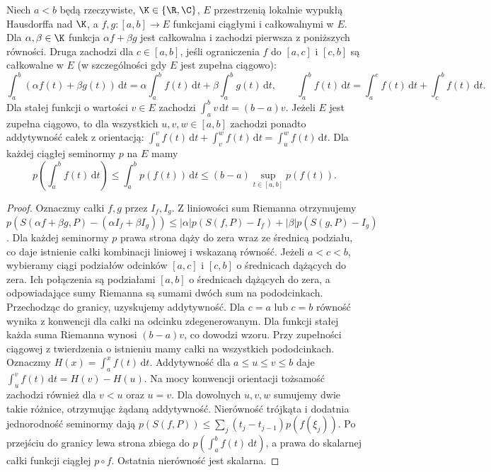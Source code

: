 \begin{stwierdzenie}
\label{prop:riemann-seminorm15a}
Niech $a<b$ będą rzeczywiste, $\K\in\{\R,\C\}$,
$E$ przestrzenią lokalnie wypukłą Hausdorffa nad $\K$,
a $f,g:[a,b]\to E$ funkcjami ciągłymi i całkowalnymi w $E$.
Dla $\alpha,\beta\in\K$ funkcja $\alpha f+\beta g$ jest
całkowalna i zachodzi pierwsza z poniższych równości.
Druga zachodzi dla $c\in[a,b]$, jeśli ograniczenia $f$ do $[a,c]$
i $[c,b]$ są całkowalne w $E$ (w szczególności gdy $E$ jest zupełna ciągowo):
\[
 \int_a^b(\alpha f(t)+\beta g(t))\,\mathrm dt
 =\alpha\int_a^b f(t)\,\mathrm dt+\beta\int_a^b g(t)\,\mathrm dt,
 \qquad \int_a^b f(t)\,\mathrm dt=\int_a^c f(t)\,\mathrm dt
 +\int_c^b f(t)\,\mathrm dt.
\]
Dla stałej funkcji o wartości $v\in E$ zachodzi
$\int_a^b v\,\mathrm dt=(b-a)v$.
Jeżeli $E$ jest zupełna ciągowo, to dla wszystkich
$u,v,w\in[a,b]$ zachodzi ponadto addytywność całek z orientacją:
$\int_u^v f(t)\,\mathrm dt+\int_v^w f(t)\,\mathrm dt
=\int_u^w f(t)\,\mathrm dt$.
Dla każdej ciągłej seminormy $p$ na $E$ mamy
\[
 p\left(\int_a^b f(t)\,\mathrm dt\right)
 \le\int_a^b p(f(t))\,\mathrm dt
 \le (b-a)\sup_{t\in[a,b]}p(f(t)).
\]
\end{stwierdzenie}
\begin{proof}
Oznaczmy całki $f,g$ przez $I_f,I_g$. Z liniowości sum
Riemanna otrzymujemy
$p(S(\alpha f+\beta g,P)-(\alpha I_f+\beta I_g))
\le|\alpha|p(S(f,P)-I_f)+|\beta|p(S(g,P)-I_g)$.
Dla każdej seminormy $p$ prawa strona dąży do zera
wraz ze średnicą podziału, co daje istnienie całki
kombinacji liniowej i wskazaną równość.
Jeżeli $a<c<b$, wybieramy ciągi podziałów odcinków $[a,c]$
i $[c,b]$ o średnicach dążących do zera. Ich połączenia są
podziałami $[a,b]$ o średnicach dążących do zera, a odpowiadające
sumy Riemanna są sumami dwóch sum na pododcinkach.
Przechodząc do granicy, uzyskujemy addytywność.
Dla $c=a$ lub $c=b$ równość wynika z konwencji dla całki
na odcinku zdegenerowanym. Dla funkcji stałej każda suma
Riemanna wynosi $(b-a)v$, co dowodzi wzoru.
Przy zupełności ciągowej z twierdzenia o istnieniu mamy
całki na wszystkich pododcinkach. Oznaczmy
$H(x)=\int_a^x f(t)\,\mathrm dt$. Addytywność dla
$a\le u\le v\le b$ daje $\int_u^v f(t)\,\mathrm dt=H(v)-H(u)$.
Na mocy konwencji orientacji tożsamość zachodzi również
dla $v<u$ oraz $u=v$. Dla dowolnych $u,v,w$ sumujemy
dwie takie różnice, otrzymując żądaną addytywność.
Nierówność trójkąta i dodatnia jednorodność seminormy dają
$p(S(f,P))\le\sum_j(t_j-t_{j-1})p(f(\xi_j))$.
Po przejściu do granicy lewa strona zbiega do
$p(\int_a^b f(t)\,\mathrm dt)$, a prawa do skalarnej
całki funkcji ciągłej $p\circ f$. Ostatnia nierówność jest skalarna.
\end{proof}

